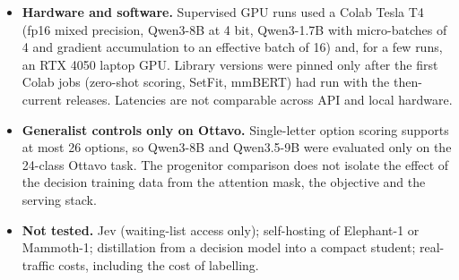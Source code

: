 \begin{itemize}
Banking77, where the exploratory recipe scored 2.6 points higher (Section~\ref{sec:results}); the two recipes were not compared on the
other datasets or models. Decoder classifiers use a newly initialised linear head that does not read the category
descriptions; a variant that keeps the language-model head and the descriptions during fine-tuning was not tested, so conclusions about
fine-tuned decoders apply to this recipe only.
\item \textbf{Hardware and software.} Supervised GPU runs used a Colab Tesla T4 (fp16 mixed precision, Qwen3-8B at 4 bit, Qwen3-1.7B with
micro-batches of 4 and gradient accumulation to an effective batch of 16) and, for a few runs, an RTX 4050 laptop GPU. Library versions
were pinned only after the first Colab jobs (zero-shot scoring, SetFit, mmBERT) had run with the then-current releases. Latencies are not
comparable across API and local hardware.
\item \textbf{Generalist controls only on Ottavo.} Single-letter option scoring supports at most 26 options, so Qwen3-8B and Qwen3.5-9B were
evaluated only on the 24-class Ottavo task. The progenitor comparison does not isolate the effect of the decision training data from the
attention mask, the objective and the serving stack.
\item \textbf{Not tested.} Jev (waiting-list access only); self-hosting of Elephant-1 or Mammoth-1; distillation from a decision model
into a compact student; real-traffic costs, including the cost of labelling.
\end{itemize}
